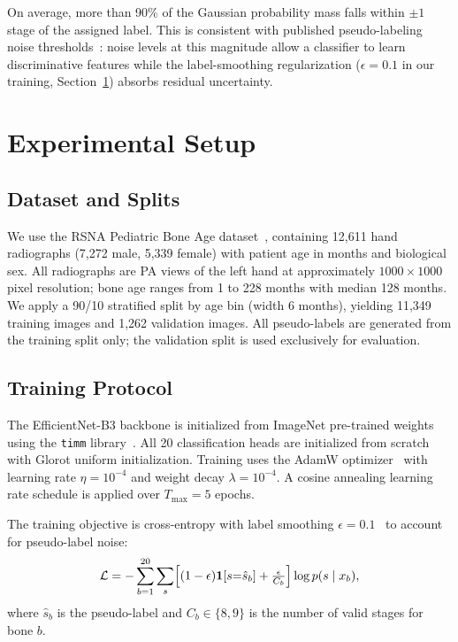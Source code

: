 \documentclass[journal]{IEEEtran}
\begin{document}
On average, more than 90\% of the Gaussian probability mass falls
within $\pm 1$ stage of the assigned label.
This is consistent with published pseudo-labeling noise
thresholds~\cite{lee2013}: noise levels at this magnitude allow
a classifier to learn discriminative features while the
label-smoothing regularization ($\epsilon = 0.1$ in our training,
Section~\ref{sec:experiments}) absorbs residual uncertainty.

\section{Experimental Setup}
\label{sec:experiments}

\subsection{Dataset and Splits}

We use the RSNA Pediatric Bone Age dataset~\cite{halabi2019},
containing 12,611 hand radiographs (7,272 male, 5,339 female)
with patient age in months and biological sex.
All radiographs are PA views of the left hand at approximately
$1000 \times 1000$ pixel resolution; bone age ranges from
1 to 228 months with median 128 months.
We apply a 90/10 stratified split by age bin (width 6 months),
yielding 11,349 training images and 1,262 validation images.
All pseudo-labels are generated from the training split only;
the validation split is used exclusively for evaluation.

\subsection{Training Protocol}

The EfficientNet-B3 backbone is initialized from ImageNet
pre-trained weights using the \texttt{timm} library~\cite{wightman2019}.
All 20 classification heads are initialized from scratch with
Glorot uniform initialization.
Training uses the AdamW optimizer~\cite{loshchilov2019}
with learning rate $\eta = 10^{-4}$ and weight decay
$\lambda = 10^{-4}$.
A cosine annealing learning rate schedule is applied over
$T_{\max} = 5$ epochs.

The training objective is cross-entropy with label smoothing
$\epsilon = 0.1$~\cite{cubuk2020} to account for pseudo-label noise:
\begin{equation}
  \mathcal{L} = -\sum_{b=1}^{20} \sum_{s}
  \Bigl[(1-\epsilon)\mathbf{1}[s{=}\hat{s}_b]
    + \tfrac{\epsilon}{C_b}\Bigr]
    \log p(s \mid x_b),
  \label{eq:loss}
\end{equation}
where $\hat{s}_b$ is the pseudo-label and $C_b \in \{8,9\}$
is the number of valid stages for bone $b$.
\end{document}
